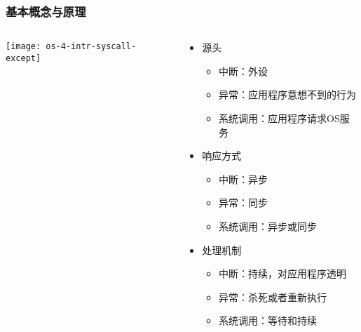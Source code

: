 \begin{frame}[plain]
	\frametitle{基本概念与原理}
	
	\begin{columns}
		
		\begin{column}{0.5\textwidth}
			\centering
			\texttt{[image: os-4-intr-syscall-except]}
		\end{column}
		
		\begin{column}{0.5\textwidth}
			
			\begin{itemize}
				\item 源头 
				\begin{itemize}
					\item 中断：外设 \pause
					\item 异常：应用程序意想不到的行为 \pause
					\item 系统调用：应用程序请求OS服务 \pause
				\end{itemize}  
				\item 响应方式  \pause
				\begin{itemize}
					\item 中断：异步
					\item 异常：同步
					\item 系统调用：异步或同步
				\end{itemize}  \pause
				\item 处理机制
				\begin{itemize} \pause
					\item 中断：持续，对应用程序透明 \pause
					\item 异常：杀死或者重新执行 \pause
					\item 系统调用：等待和持续
				\end{itemize}

			\end{itemize}		
			
		\end{column}
		
	\end{columns}
	
\end{frame}



